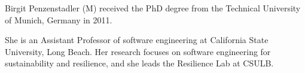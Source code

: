 \documentclass[final,journal,10pt,letterpaper,oneside,twocolumn,compsoc]%
{IEEEtran}
\begin{document}
\begin{IEEEbiography}{Birgit Penzenstadler}
(M) received the PhD degree from the
Technical University of Munich, Germany in 2011.

She is an Assistant Professor of software engineering at California State
University, Long Beach. Her research focuses on software engineering for
sustainability and resilience, and she leads the Resilience Lab at CSULB.
\end{IEEEbiography}







\end{document}
